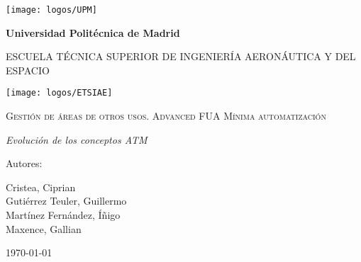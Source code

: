 \documentclass[12pt,a4paper,oneside]{book}
\renewcommand{\headrulewidth}{1pt}      %
\renewcommand{\footrulewidth}{1pt}      %
\renewcommand{\headrulewidth}{0pt}	%
\begin{document}
\begin{titlepage}
\centering
{\texttt{[image: logos/UPM]}\par}
\vspace{0.1cm}
{\bfseries\LARGE Universidad Politécnica de Madrid \par}
\vspace{0.5cm}
{\scshape\large ESCUELA TÉCNICA SUPERIOR DE INGENIERÍA AERONÁUTICA Y DEL ESPACIO \par}
\vspace{0.25cm}
{\texttt{[image: logos/ETSIAE]} \par}
\vspace{1cm}
{\scshape\Large  Gestión de áreas de otros usos. Advanced FUA Mínima automatización \par}
\vspace{0.7cm}
{\itshape\large Evolución de los conceptos ATM \par}
\vfill
{\Large Autores: \par}
{\large Cristea, Ciprian \\ Gutiérrez Teuler, Guillermo \\ Martínez Fernández, Íñigo \\ Maxence, Gallian \par}
\vfill
{\Large \today \par}
\end{titlepage}

\frontmatter

{\hypersetup{linkcolor=black}		%
	\tableofcontents
	\cleardoublepage
	\listoffigures
	\cleardoublepage
	\listoftables
}

\printglossary[type=\acronymtype,title=Acrónimos,toctitle=Acrónimos]

\pagestyle{fancy}						%
\fancyhf{}								%
\fancyfoot[R]{\thepage/{\hypersetup{linkcolor=black}\pageref{LastPage}}}
\renewcommand{\headrulewidth}{1pt}      %
\renewcommand{\footrulewidth}{1pt}      %

\mainmatter









\backmatter

\nocite{*}	%

\printbibliography[heading=bibintoc,title={Bibliografía}]
\end{document}
